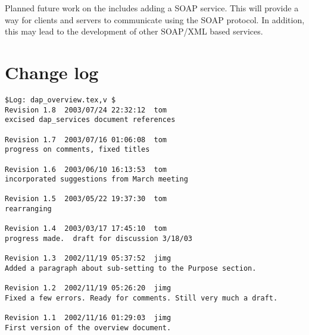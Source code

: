 \documentclass[justify]{dods-paper}
\begin{document}

Planned future work on the \DAP includes adding a \ac{SOAP} service. This
will provide a way for clients and servers to communicate using the \ac{SOAP}
protocol. In addition, this may lead to the development of other
\ac{SOAP}/\ac{XML} based services.

%

%

\section{Change log}

\begin{verbatim}
$Log: dap_overview.tex,v $
Revision 1.8  2003/07/24 22:32:12  tom
excised dap_services document references

Revision 1.7  2003/07/16 01:06:08  tom
progress on comments, fixed titles

Revision 1.6  2003/06/10 16:13:53  tom
incorporated suggestions from March meeting

Revision 1.5  2003/05/22 19:37:30  tom
rearranging

Revision 1.4  2003/03/17 17:45:10  tom
progress made.  draft for discussion 3/18/03

Revision 1.3  2002/11/19 05:37:52  jimg
Added a paragraph about sub-setting to the Purpose section.

Revision 1.2  2002/11/19 05:26:20  jimg
Fixed a few errors. Ready for comments. Still very much a draft.

Revision 1.1  2002/11/16 01:29:03  jimg
First version of the overview document.

\end{verbatim}
\end{document}
